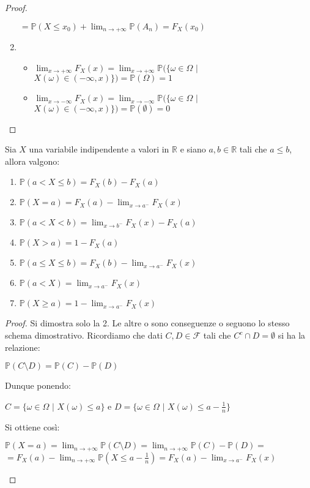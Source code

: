 \begin{theorem}
\begin{proof}
\begin{enumerate}
\begin{center}
        \newline
        $=\mathbb{P}(X\leq x_0)+\lim_{n\to+\infty}\mathbb{P}(A_n)=F_X(x_0)$
    \end{center}
    \item 
    \begin{itemize}
        \item $\lim_{x\to+\infty} F_X(x)=\lim_{x\to+\infty}\mathbb{P}(\{\omega\in\Omega$ $|$ $X(\omega)\in(-\infty,x)\})=\mathbb{P}(\Omega)=1$
        \item $\lim_{x\to-\infty} F_X(x)=\lim_{x\to-\infty}\mathbb{P}(\{\omega\in\Omega$ $|$ $X(\omega)\in(-\infty,x)\})=\mathbb{P}(\emptyset)=0$
    \end{itemize}
\end{enumerate}
\end{proof}    
\end{theorem}



\begin{proposition}
Sia $X$ una variabile indipendente a valori in $\mathbb{R}$ e siano
\newline
$a,b\in\mathbb{R}$ tali che $a\leq b$, allora valgono:
\begin{enumerate}
    \item $\mathbb{P}(a< X\leq b) = F_X(b)-F_X(a) $
    \item $\mathbb{P}(X = a) = F_X(a) - \lim_{x\to a^-}F_X(x)$
    \item $\mathbb{P}(a< X< b) = \lim_{x\to b^-}F_X(x) - F_X(a)$
    \item $\mathbb{P}(X > a) = 1 - F_X(a)$
    \item $\mathbb{P}(a\leq X\leq b) = F_X(b) - \lim_{x\to a^-}F_X(x)$
    \item $\mathbb{P}(a< X) = \lim_{x\to a^-}F_X(x)$
    \item $\mathbb{P}(X\geq a) = 1 - \lim_{x\to a^-}F_X(x)$
\end{enumerate}
\begin{proof}
Si dimostra solo la 2. Le altre o sono conseguenze o seguono lo stesso schema dimostrativo.
Ricordiamo che dati $C,D\in\mathscr{F}$ tali che $C^c\cap D=\emptyset$ si ha la relazione:
\begin{center}
    $\mathbb{P}(C\setminus D)=\mathbb{P}(C)-\mathbb{P}(D)$
\end{center}
Dunque ponendo:
\begin{center}
    $C=\{\omega\in\Omega$ $|$ $X(\omega)\leq a\}$ e $D=\{\omega\in\Omega$ $|$ $X(\omega)\leq a-\frac{1}{n}\}$ 
\end{center}
Si ottiene così:
\begin{center}
    $\mathbb{P}(X=a)=\lim_{n\to+\infty}\mathbb{P}(C\setminus D)=\lim_{n\to+\infty}\mathbb{P}(C)-\mathbb{P}(D)=$
    \vspace{5px}
    \newline
    $=F_X(a)-\lim_{n\to+\infty}\mathbb{P}(X\leq a-\frac{1}{n})=F_X(a)-\lim_{x\to a^-}F_X(x)$
\end{center}
\end{proof}
\end{proposition}

\vspace{10px}
